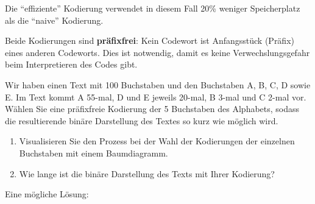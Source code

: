 Die \enquote{effiziente} Kodierung verwendet in diesem Fall 20\% weniger Speicherplatz als die \enquote{naive} Kodierung.

Beide Kodierungen sind \textbf{präfixfrei}: Kein Codewort ist Anfangsstück (Präfix) eines anderen Codeworts. Dies ist notwendig, damit es keine Verwechslungsgefahr beim Interpretieren des Codes gibt.

\begin{myexercise}
	Wir haben einen Text mit 100 Buchstaben und den Buchstaben A, B, C, D sowie E. Im Text kommt A 55-mal, D und E jeweils 20-mal, B 3-mal und C 2-mal vor. Wählen Sie eine präfixfreie Kodierung der 5 Buchstaben des Alphabets, sodass die resultierende binäre Darstellung des Textes so kurz wie möglich wird.
	\begin{enumerate}
		\item Visualisieren Sie den Prozess bei der Wahl der Kodierungen der einzelnen Buchstaben mit einem Baumdiagramm.
		\item  Wie lange ist die binäre Darstellung des Texts mit Ihrer Kodierung?
	\end{enumerate}
	\begin{myanswer}
		Eine mögliche Lösung:
		\begin{figure}[H]
			\centering
\end{figure}
\end{myanswer}
\end{myexercise}
